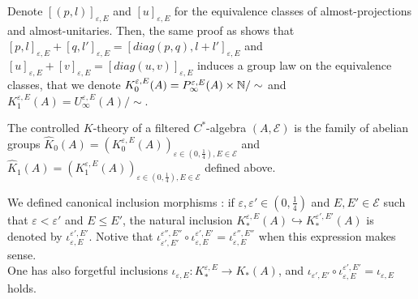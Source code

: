 Denote $[(p,l)]_{\varepsilon,E}$ and $[u]_{\varepsilon,E}$ for the equivalence classes of almost-projections and almost-unitaries. Then, the same proof as \cite{OY2} shows that $[p,l]_{\varepsilon,E}+[q,l']_{\varepsilon,E}=[diag(p,q),l+l']_{\varepsilon,E}$ and $[u]_{\varepsilon,E}+[v]_{\varepsilon,E}=[diag(u,v)]_{\varepsilon,E}$ induces a group law on the equivalence classes, that we denote $K_0^{\varepsilon,E}(A) = P^{\varepsilon, E}_\infty(A)\times \mathbb N / \sim$ and $K_1^{\varepsilon,E}(A) = U^{\varepsilon, E}_\infty(A) / \sim$.\\

\begin{definition}
The controlled $K$-theory of a filtered $C^*$-algebra $(A,\mathcal E)$ is the family of abelian groups $\hat K_0(A) = (K_0^{\varepsilon,E}(A))_{\varepsilon\in (0,\frac{1}{4}),E\in\mathcal E}$ and $\hat K_1(A) = (K_1^{\varepsilon,E}(A))_{\varepsilon\in (0,\frac{1}{4}),E\in\mathcal E}$ defined above.\\
\end{definition}

We defined canonical inclusion morphisms : if $\varepsilon, \varepsilon'\in (0,\frac{1}{4})$ and $E,E'\in\mathcal E$ such that $\varepsilon < \varepsilon'$ and $E \leq E'$, the natural inclusion $K_*^{\varepsilon,E}(A)\hookrightarrow K_*^{\varepsilon',E'}(A)$ is denoted by $\iota_{\varepsilon,E}^{\varepsilon',E'}$. Notive that $\iota_{\varepsilon',E'}^{\varepsilon'',E''}\circ\iota_{\varepsilon,E}^{\varepsilon',E'}=\iota_{\varepsilon,E}^{\varepsilon'',E''}$ when this expression makes sense.\\

One has also forgetful inclusions $\iota_{\varepsilon,E} : K_*^{\varepsilon,E}\rightarrow K_*(A)$, and 
$\iota_{\varepsilon',E'}\circ\iota_{\varepsilon,E}^{\varepsilon',E'}=\iota_{\varepsilon, E}$ holds.\\

